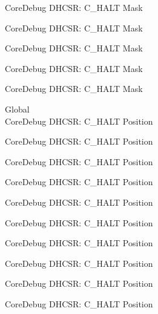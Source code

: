 \begin{DoxyRefList}
\label{deprecated__deprecated000943}%
%
Core\+Debug DHCSR\+: C\+\_\+\+HALT Mask 

\label{deprecated__deprecated001002}%
%
Core\+Debug DHCSR\+: C\+\_\+\+HALT Mask 

\label{deprecated__deprecated001078}%
%
Core\+Debug DHCSR\+: C\+\_\+\+HALT Mask 

\label{deprecated__deprecated001167}%
%
Core\+Debug DHCSR\+: C\+\_\+\+HALT Mask 

\label{deprecated__deprecated001269}%
%
Core\+Debug DHCSR\+: C\+\_\+\+HALT Mask  
\item[Global \doxylink{group___c_m_s_i_s___core_debug_gaddf1d43f8857e4efc3dc4e6b15509692}{Core\+Debug\+\_\+\+DHCSR\+\_\+\+C\+\_\+\+HALT\+\_\+\+Pos} ]\hfill \\
\label{deprecated__deprecated000037}%
%
Core\+Debug DHCSR\+: C\+\_\+\+HALT Position 

\label{deprecated__deprecated000125}%
%
Core\+Debug DHCSR\+: C\+\_\+\+HALT Position 

\label{deprecated__deprecated000181}%
%
Core\+Debug DHCSR\+: C\+\_\+\+HALT Position 

\label{deprecated__deprecated000264}%
%
Core\+Debug DHCSR\+: C\+\_\+\+HALT Position 

\label{deprecated__deprecated000323}%
%
Core\+Debug DHCSR\+: C\+\_\+\+HALT Position 

\label{deprecated__deprecated000399}%
%
Core\+Debug DHCSR\+: C\+\_\+\+HALT Position 

\label{deprecated__deprecated000488}%
%
Core\+Debug DHCSR\+: C\+\_\+\+HALT Position 

\label{deprecated__deprecated000590}%
%
Core\+Debug DHCSR\+: C\+\_\+\+HALT Position 

\label{deprecated__deprecated000715}%
%
Core\+Debug DHCSR\+: C\+\_\+\+HALT Position 

\label{deprecated__deprecated000803}%
%
Core\+Debug DHCSR\+: C\+\_\+\+HALT Position 


\end{DoxyRefList}
